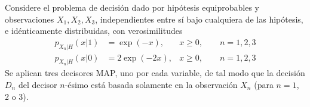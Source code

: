 \ifspanish

\question[25] %

Considere el problema de decisión dado por hipótesis equiprobables y observaciones $X_1,X_2,X_3$, independientes entre sí bajo cualquiera de las hipótesis, e idénticamente distribuidas, con verosimilitudes
\begin{align}
p_{X_n|H}(x|1) &= \exp(- x),       & x \ge 0, \qquad n=1,2,3 \nonumber\\
p_{X_n|H}(x|0) &= 2 \exp(- 2 x),   & x \ge 0, \qquad n=1,2,3 \nonumber 
\end{align}
Se aplican tres decisores MAP, uno por cada variable, de tal modo que la decisión $D_n$ del decisor $n$-ésimo está basada solamente en la observación $X_n$ (para $n=1$, 2 o 3).


\begin{solution}
\end{solution}

